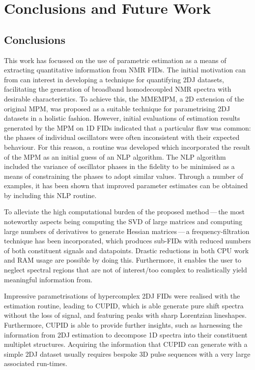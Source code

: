 \chapter{Conclusions and Future Work}
\label{chap:conclusions}

\section{Conclusions}
This work has focussed on the use of parametric estimation as a means of
extracting quantitative information from \ac{NMR} \acp{FID}. The initial
motivation can from can interest in developing a technique
for quantifying \ac{2DJ} datasets, facilitating the generation of broadband
homodecoupled \ac{NMR} spectra with desirable characteristics.
To achieve this,
the \ac{MMEMPM}, a \ac{2D} extension of the original \ac{MPM}, was proposed as
a suitable technique for parametrising \ac{2DJ} datasets in a holistic fashion.
However, initial evaluations of estimation results generated by the \ac{MPM} on
\ac{1D} \acp{FID} indicated that a particular flaw was common: the
phases of individual oscillators were often inconsistent with their expected
behaviour.
For this reason, a routine was developed which incorporated the result of the
\ac{MPM} as an initial guess of an \ac{NLP} algorithm. The \ac{NLP} algorithm
included the variance of oscillator phases in the fidelity to be minimised as a
means of constraining the phases to adopt similar values.
Through a number of examples, it has been shown that improved parameter
estimates can be obtained by including this \ac{NLP} routine.

To alleviate the high computational burden of the proposed method\,---\,the
most noteworthy aspects being computing the \ac{SVD} of large matrices and
computing large numbers of derivatives to generate Hessian matrices\,---\,a
frequency-filtration technique has been incorporated, which produces
sub-\acp{FID} with reduced numbers of both constituent signals and datapoints.
Drastic reductions in both \ac{CPU} work and \ac{RAM} usage are possible by
doing this. Furthermore, it enables the user to neglect spectral regions that
are not of interest/too complex to realistically yield meaningful information
from.

Impressive parametrisations of hypercomplex \ac{2DJ} \acp{FID} were realised
with the estimation routine, leading to \ac{CUPID}, which is able generate pure
shift spectra without the loss of signal, and featuring peaks with sharp
Lorentzian lineshapes.
Furthermore, \ac{CUPID} is able to provide further insights, such as harnessing
the information from \ac{2DJ} estimation to decompose \ac{1D} spectra into
their constituent multiplet structures. Acquiring the information that
\ac{CUPID} can generate with a simple \ac{2DJ} dataset usually requires
bespoke \ac{3D} pulse sequences with a very large associated run-times.

